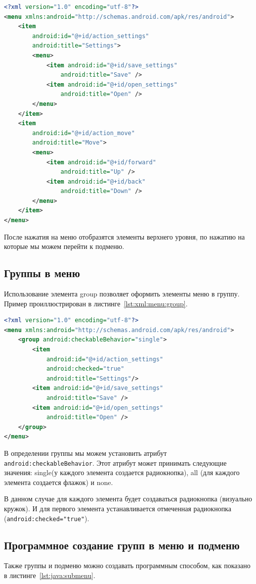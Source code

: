 \begin{lstlisting}[language=XML
	, label=lst:xml:submenu
	]
<?xml version="1.0" encoding="utf-8"?>
<menu xmlns:android="http://schemas.android.com/apk/res/android">
    <item
        android:id="@+id/action_settings"
        android:title="Settings">
        <menu>
            <item android:id="@+id/save_settings"
                android:title="Save" />
            <item android:id="@+id/open_settings"
                android:title="Open" />
        </menu>
    </item>
    <item
        android:id="@+id/action_move"
        android:title="Move">
        <menu>
            <item android:id="@+id/forward"
                android:title="Up" />
            <item android:id="@+id/back"
                android:title="Down" />
        </menu>
    </item>
</menu>
\end{lstlisting}

После нажатия на меню отобразятся элементы верхнего уровня, по нажатию
на которые мы можем перейти к подменю.

\subsection{Группы в меню}
Использование элемента group позволяет оформить элементы меню в группу.
Пример проиллюстрирован в листинге~\ref{lst:xml:menu:group}.

\begin{lstlisting}[language=XML
	, label=lst:xml:menu:group
	]
<?xml version="1.0" encoding="utf-8"?>
<menu xmlns:android="http://schemas.android.com/apk/res/android">
    <group android:checkableBehavior="single">
        <item
            android:id="@+id/action_settings"
            android:checked="true"
            android:title="Settings"/>
        <item android:id="@+id/save_settings"
            android:title="Save" />
        <item android:id="@+id/open_settings"
            android:title="Open" />
    </group>
</menu>
\end{lstlisting}

В определении группы мы можем установить атрибут
\texttt{android:checkableBehavior}. Этот атрибут может принимать следующие
значения: single(у каждого элемента создается радиокнопка), all (для каждого
элемента создается флажок) и none.\par
В данном случае для каждого элемента будет создаваться радиокнопка
(визуально кружок). И для первого элемента устанавливается отмеченная
радиокнопка (\texttt{android:checked="true"}).

\subsection{Программное создание групп в меню и подменю}
Также группы и подменю можно создавать программным способом,
как показано в листинге~\ref{lst:java:submenu}.

